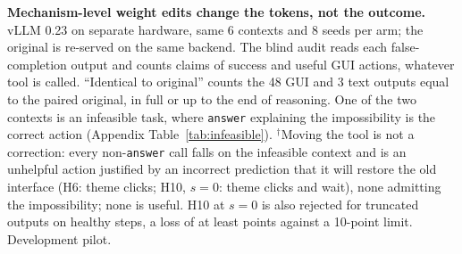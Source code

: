 \begin{table}[t]
\centering\small
\resizebox{\linewidth}{!}{}
\caption{\textbf{Mechanism-level weight edits change the tokens, not the outcome.} vLLM 0.23 on separate hardware, same 6 contexts and 8 seeds per arm; the original is re-served on the same backend. The blind audit reads each false-completion output and counts claims of success and useful GUI actions, whatever tool is called. ``Identical to original'' counts the 48 GUI and 3 text outputs equal to the paired original, in full or up to the end of reasoning. One of the two \fsp{} contexts is an infeasible task, where \texttt{answer} explaining the impossibility is the correct action (Appendix Table~\ref{tab:infeasible}). $^{\dagger}$Moving the tool is not a correction: every non-\texttt{answer} call falls on the infeasible context and is an unhelpful action justified by an incorrect prediction that it will restore the old interface (H6: \attHsixTheme{} theme clicks; H10, $s=0$: \attHtenzeroInfClick{} theme clicks and \attHtenzeroInfWait{} wait), none admitting the impossibility; none is useful. H10 at $s=0$ is also rejected for truncated outputs on healthy steps, a loss of at least \attHtenzeroHealthyLoss{} points against a 10-point limit. Development pilot.}
\label{tab:attractor}
\end{table}
